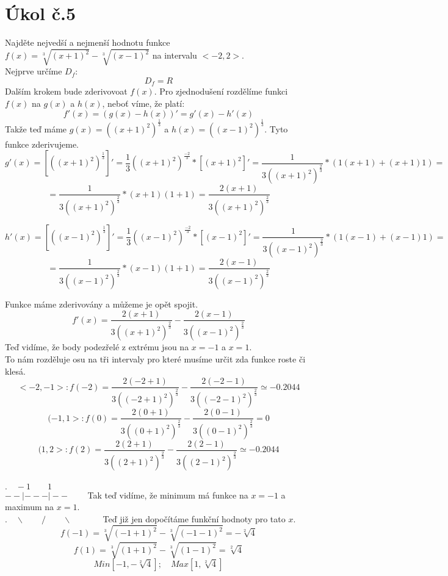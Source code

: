 \documentclass{article}
\begin{document}
\section{Úkol č.5}
Najděte nejvedší a nejmenší hodnotu funkce $f(x)=\sqrt[3]{(x+1)^2}-\sqrt[3]{(x-1)^2}$ na intervalu $<-2,2>$.
\\
Nejprve určíme $D_f$:
$$D_f=R$$
Dalším krokem bude zderivovoat $f(x)$. Pro zjednodušení rozdělíme funkci $f(x)$ na $g(x)$ a $h(x)$, neboť víme, že platí:
$$f'(x) = ( g(x)- h(x))' = g'(x) - h'(x)$$
Takže teď máme $g(x)=((x+1)^2)^{\frac{1}{3}}$ a $h(x)=((x-1)^2)^{\frac{1}{3}}$. Tyto funkce zderivujeme.
\\
$$g'(x)=[((x+1)^2)^{\frac{1}{3}}]'=\frac{1}{3}((x+1)^2)^{\frac{-2}{3}}*[(x+1)^2]'=\frac{1}{3((x+1)^2)^{\frac{2}{3}}}*(1(x+1)+(x+1)1)=$$
$$=\frac{1}{3((x+1)^2)^{\frac{2}{3}}}*(x+1)(1+1)=\frac{2(x+1)}{3((x+1)^2)^{\frac{2}{3}}}$$

$$h'(x)=[((x-1)^2)^{\frac{1}{3}}]'=\frac{1}{3}((x-1)^2)^{\frac{-2}{3}}*[(x-1)^2]'=\frac{1}{3((x-1)^2)^{\frac{2}{3}}}*(1(x-1)+(x-1)1)=$$
$$=\frac{1}{3((x-1)^2)^{\frac{2}{3}}}*(x-1)(1+1)=\frac{2(x-1)}{3((x-1)^2)^{\frac{2}{3}}}$$

Funkce máme zderivovány a můžeme je opět spojit.
$$f'(x) = \frac{2(x+1)}{3((x+1)^2)^{\frac{2}{3}}} - \frac{2(x-1)}{3((x-1)^2)^{\frac{2}{3}}} $$
Teď vidíme, že body podezřelé z extrému jsou na $x=-1$ a $x=1$.
\\
To nám rozděluje osu na tři intervaly pro které musíme určit zda funkce roste či klesá.
$$ <-2,-1>: f(-2) = \frac{2(-2+1)}{3((-2+1)^2)^{\frac{2}{3}}} - \frac{2(-2-1)}{3((-2-1)^2)^{\frac{2}{3}}} \simeq -0.2044 $$
$$ (-1,1>: f(0) = \frac{2(0+1)}{3((0+1)^2)^{\frac{2}{3}}} - \frac{2(0-1)}{3((0-1)^2)^{\frac{2}{3}}} = 0 $$
$$ (1,2>: f(2) = \frac{2(2+1)}{3((2+1)^2)^{\frac{2}{3}}} - \frac{2(2-1)}{3((2-1)^2)^{\frac{2}{3}}} \simeq -0.2044 $$
\\
$.\quad -1 \quad\quad 1 $ \\
$--|---|-- \quad\quad$ Tak teď vidíme, že minimum má funkce na $x=-1$ a maximum na $x=1$. \\
$.\quad\backslash \quad\quad / \quad\quad \backslash $
$\quad\quad\quad$ Teď již jen dopočítáme funkční hodnoty pro tato $x$.\\

$$f(-1)=\sqrt[3]{(-1+1)^2}-\sqrt[3]{(-1-1)^2} = - \sqrt[2]{4}$$
$$f(1)=\sqrt[3]{(1+1)^2}-\sqrt[3]{(1-1)^2} = \sqrt[2]{4}$$
$$Min[-1,-\sqrt[2]{4}];\quad Max[1,\sqrt[2]{4}]$$
\end{document}
